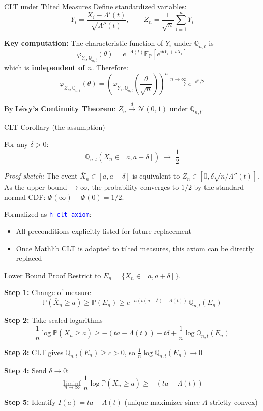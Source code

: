 \documentclass[aspectratio=169]{beamer}
\newcommand{\E}{\mathbb{E}}
\renewcommand{\P}{\mathbb{P}}
\newcommand{\Q}{\mathbb{Q}}
\newcommand{\leancode}[1]{\textcolor{blue}{\nolinkurl{#1}}}
\begin{document}
\begin{frame}{CLT under Tilted Measures}
  Define standardized variables:
  \[
    Y_i = \frac{X_i - \Lambda'(t)}{\sqrt{\Lambda''(t)}}, \qquad Z_n = \frac{1}{\sqrt{n}}\sum_{i=1}^n Y_i
  \]

  \textbf{Key computation:} The characteristic function of $Y_i$ under $\Q_{n,t}$ is
  \[
    \varphi_{Y_i, \Q_{n,t}}(\theta) = \boxed{e^{-\Lambda(t)}\E_\P[e^{i\theta Y_i + tX_i}]}
  \]
  which is \textbf{independent of $n$}. Therefore:
  \[
    \varphi_{Z_n, \Q_{n,t}}(\theta)
    = \left(\varphi_{Y_1, \Q_{n,t}}\!\left(\frac{\theta}{\sqrt{n}}\right)\right)^{\!n}
    \xrightarrow{n\to\infty} e^{-\theta^2/2}
  \]

  By \textbf{L\'evy's Continuity Theorem}: $Z_n \xrightarrow{d} \mathcal{N}(0,1)$ under $\Q_{n,t}$.
\end{frame}

\begin{frame}[fragile]{CLT Corollary (the assumption)}
  \begin{corollary}
    For any $\delta > 0$:
    \[
      \Q_{n,t}(\overline{X}_n \in [a, a+\delta]) \;\to\; \frac{1}{2}
    \]
  \end{corollary}

  \vspace{0.1cm}
  \textit{Proof sketch:} The event $\overline{X}_n \in [a, a+\delta]$ is equivalent to $Z_n \in [0, \delta\sqrt{n/\Lambda''(t)}]$. As the upper bound $\to \infty$, the probability converges to $1/2$ by the standard normal CDF: $\Phi(\infty) - \Phi(0) = 1/2$.

  \vspace{0.3cm}
  Formalized as \leancode{h\_clt\_axiom}:
  \begin{itemize}
    \item All preconditions explicitly listed for future replacement
    \item Once Mathlib CLT is adapted to tilted measures, this axiom can be directly replaced
  \end{itemize}
\end{frame}

\begin{frame}{Lower Bound Proof}
  Restrict to $E_n = \{\overline{X}_n \in [a, a+\delta]\}$.

  \textbf{Step 1:} Change of measure
  \[
    \P(\overline{X}_n \ge a) \ge \P(E_n) \ge e^{-n(t(a+\delta) - \Lambda(t))}\,\Q_{n,t}(E_n)
  \]

  \textbf{Step 2:} Take scaled logarithms
  \[
    \frac{1}{n}\log\P(\overline{X}_n \ge a) \ge -(ta - \Lambda(t)) - t\delta + \frac{1}{n}\log\Q_{n,t}(E_n)
  \]

  \textbf{Step 3:} CLT gives $\Q_{n,t}(E_n) \ge c > 0$, so $\frac{1}{n}\log\Q_{n,t}(E_n) \to 0$

  \textbf{Step 4:} Send $\delta \to 0$:
  \[
    \liminf_{n\to\infty} \frac{1}{n}\log\P(\overline{X}_n \ge a) \ge -(ta - \Lambda(t))
  \]

  \textbf{Step 5:} Identify $I(a) = ta - \Lambda(t)$ (unique maximizer since $\Lambda$ strictly convex)
\end{frame}
\end{document}
